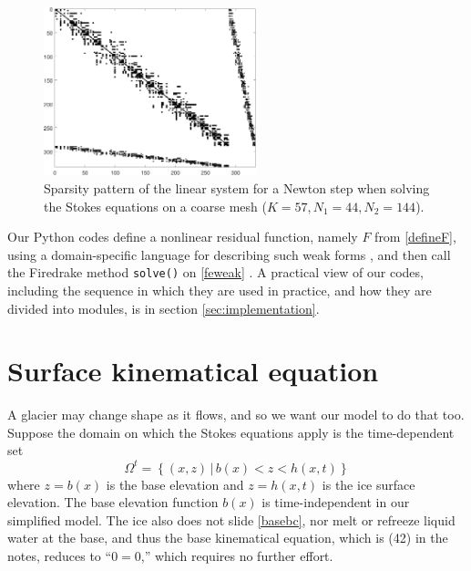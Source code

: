 \documentclass[letterpaper,final,12pt,reqno]{amsart}
\begin{document}
\begin{figure}[h]
\includegraphics[width=0.55\textwidth]{lowspy}
\caption{Sparsity pattern of the linear system for a Newton step when solving the Stokes equations on a coarse mesh ($K=57,N_1=44,N_2=144$).}
\label{fig:lowspy}
\end{figure}

Our Python codes define a nonlinear residual function, namely $F$ from \eqref{defineF}, using a domain-specific language for describing such weak forms \cite{Alnaesetal2014}, and then call the Firedrake method \texttt{solve()} on \eqref{feweak} \cite{Rathgeberetal2016}.  A practical view of our codes, including the sequence in which they are used in practice, and how they are divided into modules, is in section \ref{sec:implementation}.


\section{Surface kinematical equation} \label{sec:kinematical}

A glacier may change shape as it flows, and so we want our model to do that too.  Suppose the domain on which the Stokes equations apply is the time-dependent set
\begin{equation}
\Omega^t = \left\{(x,z)\,\big|\, b(x) < z < h(x,t)\right\}  \label{Omegat}
\end{equation}
where $z=b(x)$ is the base elevation and $z=h(x,t)$ is the ice surface elevation.  The base elevation function $b(x)$ is time-independent in our simplified model.  The ice also does not slide \eqref{basebc}, nor melt or refreeze liquid water at the base, and thus the base kinematical equation, which is (42) in the notes, reduces to ``$0=0$,'' which requires no further effort.
\end{document}
